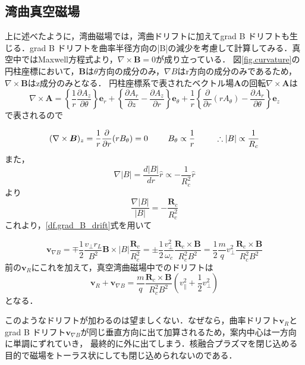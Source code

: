 \documentclass{ltjsarticle}
\numberwithin{equation}{section} %
\numberwithin{equation}{section}
\begin{document}
\subsection{湾曲真空磁場}
上に述べたように，湾曲磁場では，湾曲ドリフトに加えてgrad B ドリフトも生じる．grad B ドリフトを曲率半径方向の|B|の減少を考慮して計算してみる．真空中ではMaxwell方程式より，$\nabla \times \bm{B} = 0$が成り立っている．
図\ref{fig.curvature}の円柱座標において，$\bm{B}$は$\theta$方向の成分のみ，$\nabla B$はr方向の成分のみであるため，$\nabla \times \bm{B}$はz成分のみとなる．
円柱座標系で表されたベクトル場$\bm{A}$の回転$\nabla \times \bm{A}$は
\[
 \nabla \times \bm{A} = \left\{\frac{1}{r}\frac{\partial A_z}{\partial \theta}\right\}\bm{e}_r + \left\{\frac{\partial A_r}{\partial z}-\frac{\partial A_z}{\partial r}\right\}\bm{e}_\theta + \dfrac{1}{r}\left\{\frac{\partial}{\partial r}(rA_\theta) - \frac{\partial A_r}{\partial \theta}\right\}\bm{e}_z
\]
で表されるので

\begin{equation}
  (\nabla \times \bm{B})_z = \frac{1}{r}\frac{\partial}{\partial r} (rB_\theta) = 0 \hspace{2pc} B_\theta \propto \frac{1}{r} \hspace{2pc} \therefore |B| \propto \frac{1}{R_c}
\end{equation}
また，
\[
  \nabla |B| = \frac{d|B|}{dr}\hat{r} \propto -\frac{1}{R_c^2}\hat{r} 
\]
より
\begin{equation}
  \frac{\nabla |B|}{|B|} = -\frac{\bm{R}_c}{R_c ^2}
\end{equation}
これより，\eqref{df.grad_B_drift}式を用いて

\begin{equation}
  \bm{v}_{\nabla B} = \mp \frac{1}{2}\frac{v_\perp r_L}{B^2}\bm{B}\times |B| \frac{\bm{R}_c}{R_c ^2} = \pm \frac{1}{2} \frac{v_\perp ^2}{\omega_c}\frac{\bm{R}_c \times \bm{B}}{R_c ^2B^2} = \frac{1}{2}\frac{m}{q}v_\perp ^2 \frac{\bm{R}_c \times \bm{B}}{R_c ^2 B^2}
\end{equation}
前の$\bm{v}_R$にこれを加えて，真空湾曲磁場中でのドリフトは
\begin{equation}
  \boxed{\bm{v}_R + \bm{v}_{\nabla B} = \frac{m}{q} \frac{\bm{R}_c \times \bm{B}}{R_c ^2 B^2}\left(v_\parallel ^2 + \frac{1}{2}v_\perp ^2\right)}
\end{equation}
となる．

このようなドリフトが加わるのは望ましくない．なぜなら，曲率ドリフト$\bm{v}_R$とgrad B ドリフト$\bm{v}_{\nabla B}$が同じ垂直方向に出て加算されるため，案内中心は一方向に単調にずれていき，
最終的に外に出てしまう．核融合プラズマを閉じ込める目的で磁場をトーラス状にしても閉じ込められないのである．
\end{document}

